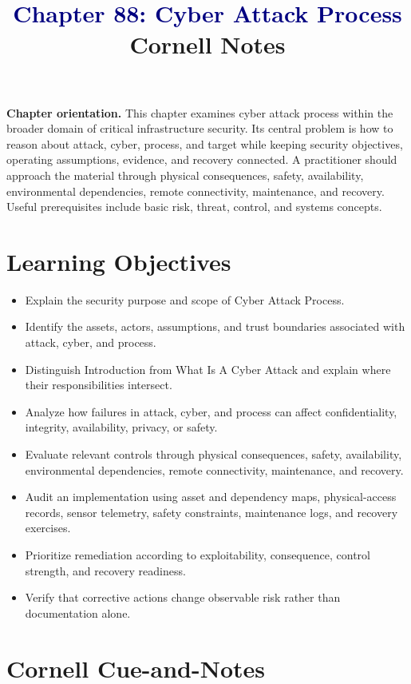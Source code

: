 \documentclass[11pt]{article}
\title{\textcolor{Navy}{Chapter 88: Cyber Attack Process}\\[2mm]\large Cornell Notes}
\author{}
\date{}
\begin{document}
\maketitle
\thispagestyle{fancy}
\vspace{-1.5em}
\begin{orientationbox}
\textbf{Chapter orientation.} This chapter examines cyber attack process within the broader domain of critical infrastructure security. Its central problem is how to reason about attack, cyber, process, and target while keeping security objectives, operating assumptions, evidence, and recovery connected. A practitioner should approach the material through physical consequences, safety, availability, environmental dependencies, remote connectivity, maintenance, and recovery. Useful prerequisites include basic risk, threat, control, and systems concepts.
\end{orientationbox}
\section*{Learning Objectives}
\begin{itemize}
\item Explain the security purpose and scope of Cyber Attack Process.
\item Identify the assets, actors, assumptions, and trust boundaries associated with attack, cyber, and process.
\item Distinguish Introduction from What Is A Cyber Attack and explain where their responsibilities intersect.
\item Analyze how failures in attack, cyber, and process can affect confidentiality, integrity, availability, privacy, or safety.
\item Evaluate relevant controls through physical consequences, safety, availability, environmental dependencies, remote connectivity, maintenance, and recovery.
\item Audit an implementation using asset and dependency maps, physical-access records, sensor telemetry, safety constraints, maintenance logs, and recovery exercises.
\item Prioritize remediation according to exploitability, consequence, control strength, and recovery readiness.
\item Verify that corrective actions change observable risk rather than documentation alone.
\end{itemize}
\section*{Cornell Cue-and-Notes}
\end{document}
